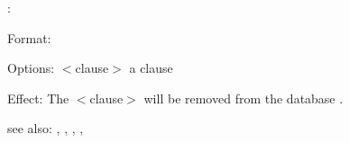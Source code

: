 \rx:

Format: 

Options: $<$clause$>$ a \RELFUN{} clause

Effect: The $<$clause$>$ will be removed from the database .

see also: \rxft, \rxhn, \consult, \destroy, \replace

